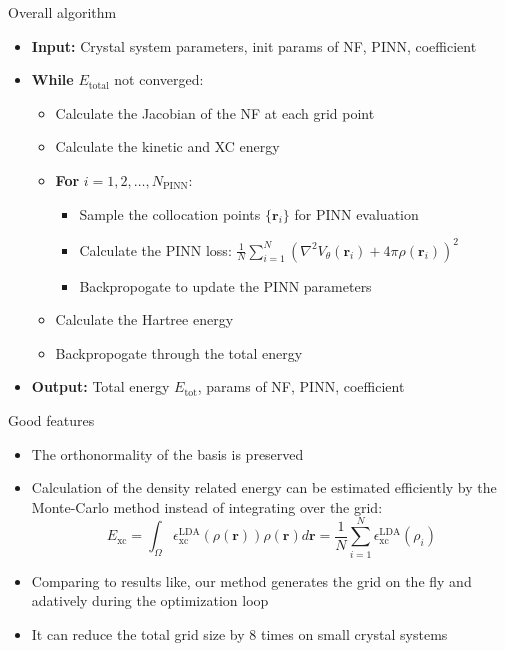 \documentclass[aspectratio=169]{beamer}
\begin{document}
\begin{frame}{Overall algorithm}
	\begin{itemize}
		\item \textbf{Input:} Crystal system parameters, init params of NF, PINN, coefficient
		\item \textbf{While} $E_{\text{total}}$ not converged:
		\begin{itemize}
			\item Calculate the Jacobian of the NF at each grid point
			\item Calculate the kinetic and XC energy
			\item \textbf{For} $i = 1, 2, \ldots, N_{\text{PINN}}$:
			\begin{itemize}
				\item Sample the collocation points $\{\mathbf{r}_i\}$ for PINN evaluation
				\item Calculate the PINN loss: $\frac{1}{N}\sum_{i=1}^N (\nabla^2 V_{\theta}(\mathbf{r}_i)
				+ 4\pi \rho(\mathbf{r}_i))^2$
				\item Backpropogate to update the PINN parameters
			\end{itemize}
			\item Calculate the Hartree energy 
			\item Backpropogate through the total energy
		\end{itemize}
		\item \textbf{Output:} Total energy $E_{\text{tot}}$, params of NF, PINN, coefficient
	\end{itemize}
\end{frame}


\begin{frame}{Good features}
	\begin{itemize}
		\item The orthonormality of the basis is preserved
		\item Calculation of the density related energy can be estimated 
		efficiently by the Monte-Carlo method instead of integrating over the
		grid:
		\begin{equation*}
			E_{\text{xc}} = \int_{\Omega} \epsilon_{\text{xc}}^{\text{LDA}}(\rho(\mathbf{r}))
			\rho(\mathbf{r})d\mathbf{r} = \frac{1}{N} \sum_{i=1}^N \epsilon_{\text{xc}}^{\text{LDA}}(\rho_i)
		\end{equation*}
		\item Comparing to results like, our method generates the grid on the fly and
		adatively during the optimization loop
		\item It can reduce the total grid size by $8$ times on small crystal systems
	\end{itemize}
\end{frame}
\end{document}
